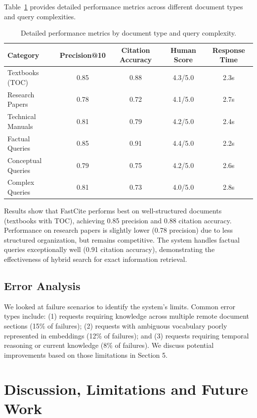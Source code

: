 \documentclass[runningheads]{llncs}
\begin{document}
Table~\ref{tab:detailed_metrics} provides detailed performance metrics across different document types and query complexities.

\begin{table}
\caption{Detailed performance metrics by document type and query complexity.}
\label{tab:detailed_metrics}
\begin{tabular}{|l|c|c|c|c|}
\hline
\textbf{Category} & \textbf{Precision@10} & \textbf{Citation Accuracy} & \textbf{Human Score} & \textbf{Response Time} \\
\hline
Textbooks (TOC) & 0.85 & 0.88 & 4.3/5.0 & 2.3s \\
Research Papers & 0.78 & 0.72 & 4.1/5.0 & 2.7s \\
Technical Manuals & 0.81 & 0.79 & 4.2/5.0 & 2.4s \\
\hline
Factual Queries & 0.85 & 0.91 & 4.4/5.0 & 2.2s \\
Conceptual Queries & 0.79 & 0.75 & 4.2/5.0 & 2.6s \\
Complex Queries & 0.81 & 0.73 & 4.0/5.0 & 2.8s \\
\hline
\end{tabular}
\end{table}

Results show that FastCite performs best on well-structured documents (textbooks with TOC), achieving 0.85 precision and 0.88 citation accuracy. Performance on research papers is slightly lower (0.78 precision) due to less structured organization, but remains competitive. The system handles factual queries exceptionally well (0.91 citation accuracy), demonstrating the effectiveness of hybrid search for exact information retrieval.

\subsection{Error Analysis}

We looked at failure scenarios to identify the system's limits.  Common error types include: (1) requests requiring knowledge across multiple remote document sections (15\% of failures); (2) requests with ambiguous vocabulary poorly represented in embeddings (12\% of failures); and (3) requests requiring temporal reasoning or current knowledge (8\% of failures).  We discuss potential improvements based on those limitations in Section 5.
%
%
\section{Discussion, Limitations and Future Work}
\end{document}
